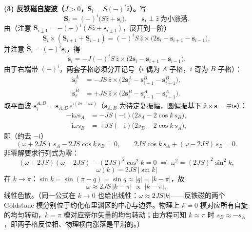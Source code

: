 \textbf{(3) 反铁磁自旋波（$J>0$，$\pmb S_i=S(-)^i\hat z$）。}写
\begin{equation*}
\pmb S_i=(-)^i\big(S\hat z+\pmb s_i\big),\qquad \pmb s_i\perp\hat z\ \text{为小涨落}.
\end{equation*}
由（注意 $\pmb S_{i\pm1}=-(-)^i(S\hat z+\pmb s_{i\pm1})$，展开到一阶）
\begin{equation*}
\pmb S_i\times(\pmb S_{i+1}+\pmb S_{i-1})=(-)^iS\,\hat z\times\big(2\pmb s_i-\pmb s_{i+1}-\pmb s_{i-1}\big),
\end{equation*}
并注意 $\dot{\pmb S}_i=(-)^i\dot{\pmb s}_i$，得
\begin{equation*}
\dot{\pmb s}_i=-J(-)^iS\,\hat z\times\big(2\pmb s_i-\pmb s_{i+1}-\pmb s_{i-1}\big).
\end{equation*}
由于右端带 $(-)^i$，两套子格必须分开记号（$i$ 偶为 $A$ 子格，$i$ 奇为 $B$ 子格）：
\begin{align*}
\dot{\pmb s}^A_i&=-JS\,\hat z\times\big(2\pmb s^A_i-\pmb s^B_{i-1}-\pmb s^B_{i+1}\big),\\
\dot{\pmb s}^B_i&=+JS\,\hat z\times\big(2\pmb s^B_i-\pmb s^A_{i-1}-\pmb s^A_{i+1}\big).
\end{align*}
取平面波 $\pmb s^{A,B}_i=\pmb s_{A,B}\,e^{\mathrm{i}(ki-\omega t)}$（$\pmb s_{A,B}$ 为待定复振幅，圆偏振基下 $\hat z\times\pmb s=\mp\mathrm{i}\pmb s$）：
\begin{align*}
-\mathrm{i}\omega s_A&=-JS(-\mathrm{i})\big(2s_A-2\cos k\,s_B\big),\\
-\mathrm{i}\omega s_B&=+JS(-\mathrm{i})\big(2s_B-2\cos k\,s_A\big),
\end{align*}
即（约去 $-\mathrm{i}$）
\begin{equation*}
(\omega+2JS)\,s_A-2JS\cos k\,s_B=0,\qquad
2JS\cos k\,s_A+(\omega-2JS)\,s_B=0 .
\end{equation*}
非零解要求行列式为零：
\begin{equation*}
(\omega+2JS)(\omega-2JS)-(2JS)^2\cos^2k=0
\;\Longrightarrow\;
\omega^2=(2JS)^2\sin^2k ,
\end{equation*}
\begin{equation*}
\boxed{\;\omega(k)=2JS\,|\sin k|\;}
\end{equation*}
在 $k\to\pi$：$\sin k=\sin(\pi-q)=\sin q\approx|q|=|k-\pi|$，故
\begin{equation*}
\omega\approx2JS\,|k-\pi|\;\propto\;|k-\pi| ,
\end{equation*}
线性色散。（同一公式在 $k\to0$ 也给出线性：$\omega\approx2JS|k|$——反铁磁的两个 Goldstone 模分别位于约化布里渊区的中心与边界。物理上 $k=0$ 模对应所有自旋的均匀转动，$k=\pi$ 模对应奈尔矢量的均匀转动；由方程可知 $k\approx\pi$ 时 $s_B\approx-s_A$，即两子格反位相、物理横向涨落是平滑的。）

